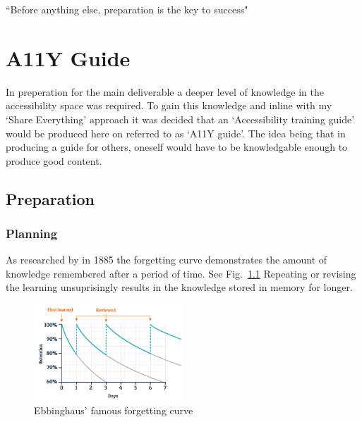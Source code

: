 \begin{savequote}[75mm]
``Before anything else, preparation is the key to success"
\end{savequote}

\chapter{A11Y Guide}
In preperation for the main deliverable a deeper level of knowledge in the
accessibility space was required. To gain this knowledge and inline with my
`Share Everything' approach it was decided that an `Accessibility
training guide' would be produced here on referred to as `A11Y guide'. The idea
being that in producing a guide for others, oneself would have to be
knowledgable enough to produce good content.

\section{Preparation}
\subsection{Planning}

As researched by \citep{Ebbinghaus} in 1885 the forgetting curve demonstrates the
amount of knowledge remembered after a period of time. See Fig.~\ref{fig:ebbinghaus}
Repeating or revising the learning unsuprisingly results in the knowledge
stored in memory for longer.

\begin{figure}[H]
\centering
\includegraphics[width=0.5\textwidth]{figures/ebbinghaus}
\captionsetup{justification=centering}
\caption{Ebbinghaus' famous forgetting curve
\label{fig:ebbinghaus}}
\end{figure}

